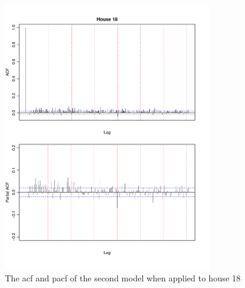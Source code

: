 \begin{figure}
    \centering
    \includegraphics[width=0.8\textwidth]{../../../figures/arimax/ACF_18_long.pdf}
    \caption{The acf and pacf of the second model when applied to house 18}
    \label{fig:Model2_acf_18_long}
\end{figure}    
